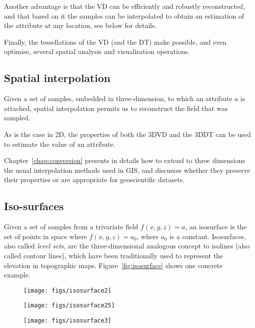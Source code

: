 Another advantage is that the VD can be efficiently and robustly reconstructed, and that based on it the samples can be interpolated to obtain an estimation of the attribute at any location, see below for details.

Finally, the tessellations of the VD (and the DT) make possible, and even optimise, several spatial analysis and visualisation operations.




\subsection{Spatial interpolation}%
\label{sec:interpol}

Given a set of samples, embedded in three-dimension, to which an attribute $a$ is attached, spatial interpolation permits us to reconstruct the field that was sampled.

As is the case in 2D, the properties of both the 3DVD and the 3DDT can be used to estimate the value of an attribute.

Chapter~\ref{chap:conversion} presents in details how to extend to three dimensions the usual interpolation methods used in GIS, and discusses whether they preserve their properties or are appropriate for geoscientific datasets.





\subsection{Iso-surfaces}

Given a set of samples from a trivariate field $f(x,y,z) = a$, an isosurface is the set of points in space where $f(x,y,z) = a_0$, where $a_0$ is a constant. 
Isosurfaces, also called \emph{level sets}, are the three-dimensional analogous concept to isolines (also called contour lines), which have been traditionally used to represent the elevation in topographic maps.
Figure~\ref{fig:isosurface} shows one concrete example.
\begin{figure*}
  \centering
  \begin{subfigure}[b]{0.28\linewidth}
    \centering
    \texttt{[image: figs/isosurface2]}
    \caption{}
  \end{subfigure}%
  \qquad
  \begin{subfigure}[b]{0.28\linewidth}
    \centering
    \texttt{[image: figs/isosurface25]}
    \caption{}
  \end{subfigure}
  \qquad
  \begin{subfigure}[b]{0.28\linewidth}
    \centering
    \texttt{[image: figs/isosurface3]}
    \caption{}
  \end{subfigure}
\caption[An oceanographic dataset with three isosurfaces]{An oceanographic dataset where each point has the temperature of the water, and three isosurfaces extracted (for a value of respectively 2.0, 2.5 and 3.5) from this dataset.}%
\label{fig:isosurface}
\end{figure*}

